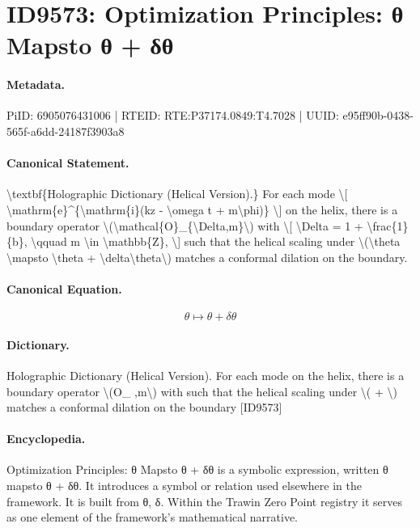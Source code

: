 \section*{ID9573: Optimization Principles: θ Mapsto θ + δθ}
\paragraph{Metadata.}
PiID: 6905076431006 | RTEID: RTE:P37174.0849:T4.7028 | UUID: e95ff90b-0438-565f-a6dd-24187f3903a8

\paragraph{Canonical Statement.}
\textbackslash{}textbf\{Holographic Dictionary (Helical Version).\} For each mode \textbackslash{}[ \textbackslash{}mathrm\{e\}\textasciicircum{}\{\textbackslash{}mathrm\{i\}(kz - \textbackslash{}omega t + m\textbackslash{}phi)\} \textbackslash{}] on the helix, there is a boundary operator \textbackslash{}(\textbackslash{}mathcal\{O\}\_\{\textbackslash{}Delta,m\}\textbackslash{}) with \textbackslash{}[ \textbackslash{}Delta = 1 + \textbackslash{}frac\{1\}\{b\}, \textbackslash{}qquad m \textbackslash{}in \textbackslash{}mathbb\{Z\}, \textbackslash{}] such that the helical scaling under \textbackslash{}(\textbackslash{}theta \textbackslash{}mapsto \textbackslash{}theta + \textbackslash{}delta\textbackslash{}theta\textbackslash{}) matches a conformal dilation on the boundary.

\paragraph{Canonical Equation.}
\[
\theta \mapsto \theta + \delta\theta
\]

\paragraph{Dictionary.}
Holographic Dictionary (Helical Version). For each mode on the helix, there is a boundary operator \textbackslash{}(O\_ ,m\textbackslash{}) with such that the helical scaling under \textbackslash{}( + \textbackslash{}) matches a conformal dilation on the boundary [ID9573]

\paragraph{Encyclopedia.}
Optimization Principles: θ Mapsto θ + δθ is a symbolic expression, written θ mapsto θ + δθ. It introduces a symbol or relation used elsewhere in the framework. It is built from θ, δ. Within the Trawin Zero Point registry it serves as one element of the framework's mathematical narrative.
